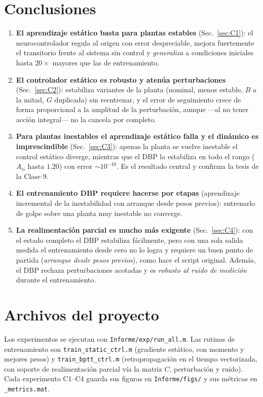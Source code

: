 \documentclass[11pt,a4paper]{article}
\newcommand{\code}[1]{\texttt{\small #1}}
\begin{document}
\section{Conclusiones}
\begin{enumerate}
  \item \textbf{El aprendizaje estático basta para plantas estables} (Sec.~\ref{sec:C1}):
  el neurocontrolador regula al origen con error despreciable, mejora fuertemente el
  transitorio frente al sistema sin control y \emph{generaliza} a condiciones iniciales
  hasta $20\times$ mayores que las de entrenamiento.

  \item \textbf{El controlador estático es robusto y atenúa perturbaciones}
  (Sec.~\ref{sec:C2}): estabiliza variantes de la planta (nominal, menos estable, $B$ a
  la mitad, $G$ duplicada) sin reentrenar, y el error de seguimiento crece de forma
  proporcional a la amplitud de la perturbación, aunque —al no tener acción integral— no
  la cancela por completo.

  \item \textbf{Para plantas inestables el aprendizaje estático falla y el dinámico es
  imprescindible} (Sec.~\ref{sec:C3}): apenas la planta se vuelve inestable el control
  estático diverge, mientras que el DBP la estabiliza en todo el rango
  ($A_{ii}$ hasta $1.20$) con error $\sim10^{-10}$. Es el resultado central y confirma la
  tesis de la Clase 9.

  \item \textbf{El entrenamiento DBP requiere hacerse por etapas} (aprendizaje incremental de
  la inestabilidad con arranque desde pesos previos): entrenarlo de golpe sobre una planta muy
  inestable no converge.

  \item \textbf{La realimentación parcial es mucho más exigente} (Sec.~\ref{sec:C4}):
  con el estado completo el DBP estabiliza fácilmente, pero con una sola salida medida
  el entrenamiento desde cero no lo logra y requiere un buen punto de partida
  (\emph{arranque desde pesos previos}), como hace el script original. Además, el DBP rechaza
  perturbaciones acotadas y es \emph{robusto al ruido de medición} durante el
  entrenamiento.
\end{enumerate}

\appendix
\section{Archivos del proyecto}
Los experimentos se ejecutan con \code{Informe/exp/run\_all.m}. Las rutinas de
entrenamiento son \code{train\_static\_ctrl.m} (gradiente estático, con momento y
mejores pesos) y \code{train\_bptt\_ctrl.m} (retropropagación en el tiempo vectorizada,
con soporte de realimentación parcial vía la matriz $C$, perturbación y ruido). Cada
experimento C1--C4 guarda sus figuras en \code{Informe/figs/} y sus métricas en
\code{*\_metrics.mat}.
\end{document}
